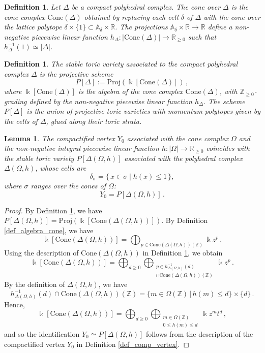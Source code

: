 \documentclass[12pt,letterpaper, reqno]{amsart}
\newtheorem{lemma}[theorem]{Lemma}
\theoremstyle{defstyle} \newtheorem{definition}[theorem]{Definition}
\theoremstyle{remark}
\numberwithin{equation}{section}
\numberwithin{figure}{section}
\newcommand{\Proj} {\mathrm{Proj}}
\newcommand{\kk} {\Bbbk}
\newcommand{\A} {\mathbb{A}}
\newcommand{\RR} {\mathbb{R}}
\newcommand{\ZZ} {\mathbb{Z}}
\begin{document}
\begin{definition} \label{def_cone_delta}
Let $\Delta$ be a compact polyhedral complex. The \emph{cone over $\Delta$} is the cone complex
$\mathrm{Cone}(\Delta)$
obtained by replacing each cell $\delta$ of $\Delta$ with the cone over the lattice polytope
$\delta\times\{1\}\subset \A_\delta\times\RR$. The projections $\A_\delta \times \RR \rightarrow \RR$ define a non-negative piecewise linear function $h_\Delta: |\mathrm{Cone}(\Delta)| \rightarrow \RR_{\geq 0}$ such that $h_{\Delta}^{-1}(1) \simeq |\Delta|$.
\end{definition}


\begin{definition} \label{def_stable_toric}
The \emph{stable toric variety} associated to the compact polyhedral complex $\Delta$ is the projective scheme 
\[ P[\Delta] := \Proj\left( \kk[\mathrm{Cone}(\Delta)]\right) \,,\]
where $\kk[\mathrm{Cone}(\Delta)]$ is the algebra of the cone complex $\mathrm{Cone}(\Delta)$, with $\ZZ_{\geq 0}$-grading defined by the non-negative piecewise linear function $h_\Delta$. 
The scheme $P[\Delta]$ is the union of projective toric varieties with momentum polytopes 
given by the cells of $\Delta$, glued along their toric strata. 
\end{definition}



\begin{lemma} \label{lem_1}
The compactified vertex $Y_0$ associated with the cone complex $\Omega$ and the non-negative integral
piecewise linear function $h: |\Omega| \rightarrow \RR_{\geq 0}$ coincides with the stable toric variety $P[\Delta(\Omega,h)]$ associated with the polyhedral complex $\Delta(\Omega,h)$, whose cells are
\[
\delta_\sigma=\{\,x\in\sigma\mid h(x)\le 1\,\},
\]
where $\sigma$ ranges over the cones of $\Omega$:
\[ Y_0 = P[\Delta(\Omega, h)] \,.\]
\end{lemma}

\begin{proof}
By Definition \ref{def_stable_toric}, we have $P[\Delta(\Omega,h)] = \Proj(\kk[\mathrm{Cone}(\Delta(\Omega,h))])$. By Definition \ref{def_algebra_cone}, we have 
\[\kk[\mathrm{Cone}(\Delta(\Omega,h))] = \bigoplus_{p \in \mathrm{Cone}(\Delta(\Omega,h))(\ZZ)} \kk z^p \,. \]
Using the description of $\mathrm{Cone}(\Delta(\Omega,h))$ in Definition 
\ref{def_cone_delta}, we obtain
\[\kk[\mathrm{Cone}(\Delta(\Omega,h))] = \bigoplus_{d \geq 0} \bigoplus_{\substack{
p \in h_{\Delta(\Omega,h)}^{-1}(d) \\ \cap  \mathrm{Cone}(\Delta(\Omega,h))(\ZZ)}} \kk z^p \,.\]
By the definition of $\Delta(\Omega,h)$, we have 
\[h_{\Delta(\Omega,h)}^{-1}(d) \cap  \mathrm{Cone}(\Delta(\Omega,h))(\ZZ)= \{ m \in \Omega(\ZZ)\,|\, h(m) \leq d \} \times \{d\} \,. \]
Hence, 
\[\kk[\mathrm{Cone}(\Delta(\Omega,h))] =  \bigoplus_{d \geq 0}  \bigoplus_{\substack{m \in \Omega(\ZZ) \\ 
0 \leq h(m) \leq d}} \kk z^m t^d \,,\]
and so the identification 
$Y_0 \simeq P[\Delta(\Omega, h)]$
follows from the description of the compactified vertex $Y_0$
in Definition \ref{def_comp_vertex}.
\end{proof}
\end{document}
